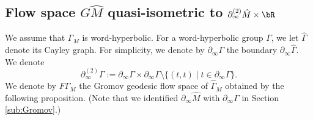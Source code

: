 %



\subsection{Flow space $G\hat M$ quasi-isometric to $\partial_\infty^{(2)}\hat M \times \bR$}


We assume that $\Gamma_M$ is word-hyperbolic. 
For a word-hyperbolic group $\Gamma$, we let $\hat \Gamma$ denote its Cayley graph.
For simplicity, we denote by $\partial_\infty \Gamma$ the boundary 
$\partial_\infty \hat \Gamma$. 
We denote \[\partial_\infty^{(2)}\Gamma
:=\partial_\infty\Gamma\times\partial_\infty \Gamma \setminus \{(t,t)\mid t\in\partial_\infty \Gamma\}.\]
We denote by $F\Gamma_M$ the Gromov 
geodesic flow space of $\hat{\Gamma}_M$ obtained by the following proposition. 
(Note that we identified $\partial_\infty \hat M$ with $\partial_\infty \Gamma$ in
Section \ref{sub:Gromov}.) 


